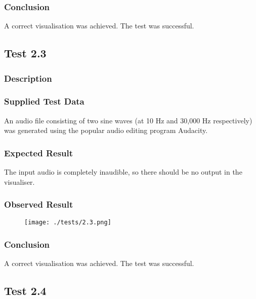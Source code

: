\subsubsection*{Conclusion}
A correct visualisation was achieved. The test was successful.

\pagebreak
\subsection{Test 2.3}
\subsubsection*{Description}
\paragraph{}
{
	\centering
}

\subsubsection*{Supplied Test Data}
An audio file consisting of two sine waves (at 10 Hz and 30,000 Hz respectively) was generated using the popular audio editing program Audacity.

\subsubsection*{Expected Result}
The input audio is completely inaudible, so there should be no output in the visualiser.

\subsubsection*{Observed Result}
\label{sec:evidence2.3}
\begin{figure}[H]
	\texttt{[image: ./tests/2.3.png]}
\end{figure}

\subsubsection*{Conclusion}
A correct visualisation was achieved. The test was successful.

\pagebreak
\subsection{Test 2.4}
